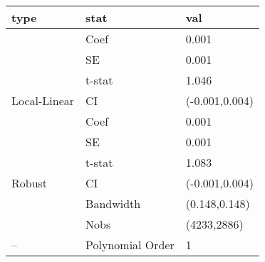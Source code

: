 
\begin{tabular}{lll}
\toprule
type & stat & val\\
\midrule
 & Coef & 0.001\\

 & SE & 0.001\\

 & t-stat & 1.046\\

\multirow{-4}{*}{\raggedright\arraybackslash Local-Linear} & CI & (-0.001,0.004)\\
\cmidrule{1-3}
 & Coef & 0.001\\

 & SE & 0.001\\

 & t-stat & 1.083\\

\multirow{-4}{*}{\raggedright\arraybackslash Robust} & CI & (-0.001,0.004)\\
\cmidrule{1-3}
 & Bandwidth & (0.148,0.148)\\

 & Nobs & (4233,2886)\\

\multirow{-3}{*}{\raggedright\arraybackslash --} & Polynomial Order & 1\\
\bottomrule
\end{tabular}